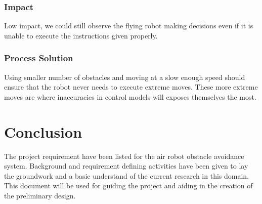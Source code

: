 \documentclass{article}
\begin{document}
		\subsubsection{Impact}
		
		Low impact, we could still observe the flying robot making decisions even if it is unable to execute the instructions given properly.
		
		\subsubsection{Process Solution}
		
		Using smaller number of obstacles and moving at a slow enough speed should ensure that the robot never needs to execute extreme moves. These more extreme moves are where inaccuracies in control models will exposes themselves the most. 

\section{Conclusion}

The project requirement have been listed for the air robot obstacle avoidance system. Background and requirement defining activities have been given to lay the groundwork and a basic understand of the current research in this domain. This document will be used for guiding the project and aiding in the creation of the preliminary design. 


\printbibliography

\end{document}
